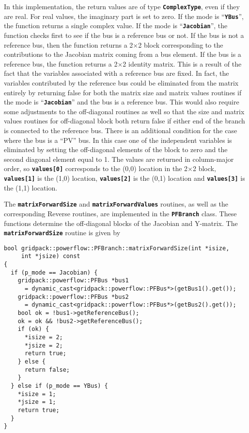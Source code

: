 In this implementation, the return values are of type
\texttt{\textbf{ComplexType}}, even if they are real. For real values, the
imaginary part is set to zero. If the mode is ``\texttt{\textbf{YBus}}'', the
function returns a single complex value. If the mode is
``\texttt{\textbf{Jacobian}}'', the function checks first to see if the bus is a
reference bus or not. If the bus is not a reference bus, then the function
returns a 2$\mathrm{\times}$2 block corresponding to the contributions to the
Jacobian matrix coming from a bus element. If the bus is a reference bus, the
function returns a 2$\mathrm{\times}$2 identity matrix. This is a result of the
fact that the variables associated with a reference bus are fixed. In fact, the
variables contributed by the reference bus could be eliminated from the matrix
entirely by returning false for both the matrix size and matrix values routines
if the mode is ``\texttt{\textbf{Jacobian}}'' and the bus is a reference bus.
This would also require some adjustments to the off-diagonal routines as well so
that the size and matrix values routines for off-diagonal block both return
false if either end of the branch is connected to the reference bus. There is an additional condition for the case where the bus is a ``PV'' bus. In this case one of the independent variables is eliminated by setting the off-diagonal elements of the block to zero and the second diagonal element equal to 1. The values are returned in column-major order, so \texttt{\textbf{values[0]}} corresponds to the (0,0) location in the 2$\mathrm{\times}$2 block, \texttt{\textbf{values[1]}} is the (1,0) location, \texttt{\textbf{values[2]}} is the (0,1) location and \texttt{\textbf{values[3]}} is the (1,1) location.

The \texttt{\textbf{matrixForwardSize}} and \texttt{\textbf{matrixForwardValues}} routines, as well as the corresponding Reverse routines, are implemented in the \texttt{\textbf{PFBranch}} class. These functions determine the off-diagonal blocks of the Jacobian and Y-matrix. The \texttt{\textbf{matrixForwardSize}} routine is given by

{
\color{red}
\begin{Verbatim}[fontseries=b]
bool gridpack::powerflow::PFBranch::matrixForwardSize(int *isize,
     int *jsize) const
{
  if (p_mode == Jacobian) {
    gridpack::powerflow::PFBus *bus1
      = dynamic_cast<gridpack::powerflow::PFBus*>(getBus1().get());
    gridpack::powerflow::PFBus *bus2
      = dynamic_cast<gridpack::powerflow::PFBus*>(getBus2().get());
    bool ok = !bus1->getReferenceBus();
    ok = ok && !bus2->getReferenceBus();
    if (ok) {
      *isize = 2;
      *jsize = 2;
      return true;
    } else {
      return false;
    }
  } else if (p_mode == YBus) {
    *isize = 1;
    *jsize = 1;
    return true;
  }
}
\end{Verbatim}
}

